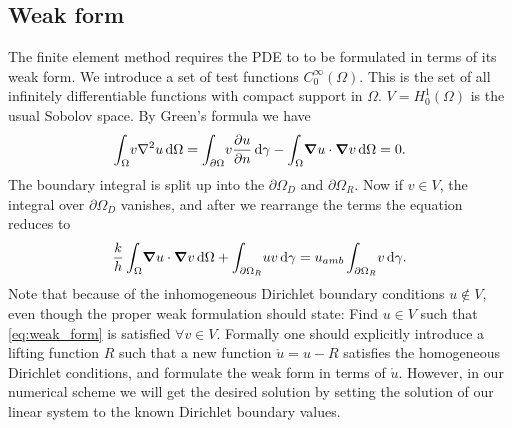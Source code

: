 \subsection{Weak form}
The finite element method requires the PDE to to be formulated in terms of its weak form. We introduce a set of test functions $C_0^\infty(\Omega)$. This is the set of all infinitely differentiable functions with compact support in $\Omega$. $V = H_0^1(\Omega)$ is the usual Sobolov space. By Green's formula we have
\begin{equation}
	\int_\Omega \! v\laplacian{u} \, \mathrm{d}\Omega = \int_{\partial\Omega} \! v\pdv{u}{n} \, \mathrm{d}\gamma -  \int_\Omega \! \grad{u}\cdot\grad{v} \, \mathrm{d}\Omega = 0
	\label{eq:green}.
\end{equation}
The boundary integral is split up into the $\partial\Omega_D$ and $\partial\Omega_R$. Now if $v \in V$, the integral over $\partial\Omega_D$ vanishes, and after we rearrange the terms the equation reduces to 
\begin{equation}
	\frac{k}{h}\int_\Omega \! \grad{u}\cdot\grad{v} \, \mathrm{d}\Omega + \int_{\partial\Omega_R} \! uv\, \mathrm{d}\gamma = u_{amb}\int_{\partial\Omega_R} \! v \, \mathrm{d}\gamma.
	\label{eq:weak_form}
\end{equation}
Note that because of the inhomogeneous Dirichlet boundary conditions $u \notin V$, even though the proper weak formulation should state: Find $u \in V$ such that \eqref{eq:weak_form} is satisfied $\forall v \in V$. Formally one should explicitly introduce a lifting function $R$ such that a new function $\mathring{u} = u - R$ satisfies the homogeneous Dirichlet conditions, and formulate the weak form in terms of $\mathring{u}$. However, in our numerical scheme we will get the desired solution by setting the solution of our linear system to the known Dirichlet boundary values.

